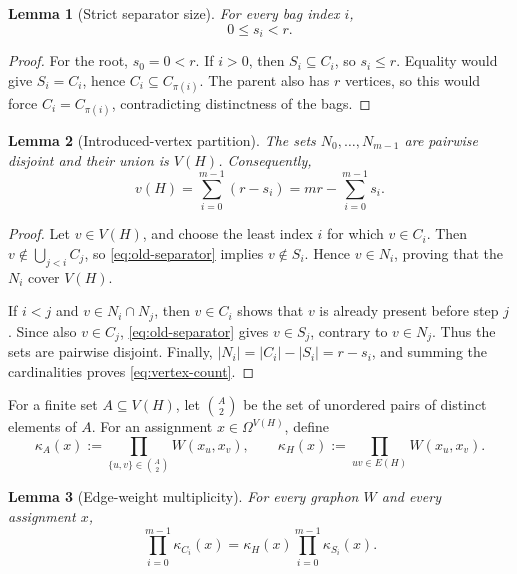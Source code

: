 \documentclass[11pt]{article}
\newtheorem{lemma}{Lemma}
\begin{document}
\begin{lemma}[Strict separator size]\label{lem:separator-size}
For every bag index \(i\),
\[
    0\le s_i<r.
\]
\end{lemma}

\begin{proof}
For the root, \(s_0=0<r\).  If \(i>0\), then \(S_i\subseteq C_i\), so
\(s_i\le r\).  Equality would give \(S_i=C_i\), hence
\(C_i\subseteq C_{\pi(i)}\).  The parent also has \(r\) vertices, so this
would force \(C_i=C_{\pi(i)}\), contradicting distinctness of the bags.
\end{proof}

\begin{lemma}[Introduced-vertex partition]\label{lem:new-partition}
The sets \(N_0,\dots,N_{m-1}\) are pairwise disjoint and their union is
\(V(H)\).  Consequently,
\begin{equation}\label{eq:vertex-count}
    v(H)
    =
    \sum_{i=0}^{m-1}(r-s_i)
    =
    mr-\sum_{i=0}^{m-1}s_i.
\end{equation}
\end{lemma}

\begin{proof}
Let \(v\in V(H)\), and choose the least index \(i\) for which \(v\in C_i\).
Then \(v\notin\bigcup_{j<i}C_j\), so
\eqref{eq:old-separator} implies \(v\notin S_i\).  Hence \(v\in N_i\), proving
that the \(N_i\) cover \(V(H)\).

If \(i<j\) and \(v\in N_i\cap N_j\), then \(v\in C_i\) shows that \(v\) is
already present before step \(j\).  Since also \(v\in C_j\),
\eqref{eq:old-separator} gives \(v\in S_j\), contrary to \(v\in N_j\).
Thus the sets are pairwise disjoint.  Finally,
\(|N_i|=|C_i|-|S_i|=r-s_i\), and summing the cardinalities proves
\eqref{eq:vertex-count}.
\end{proof}

For a finite set \(A\subseteq V(H)\), let \(\binom A2\) be the set of
unordered pairs of distinct elements of \(A\).  For an assignment
\(x\in\Omega^{V(H)}\), define
\[
    \kappa_A(x)
    :=
    \prod_{\{u,v\}\in\binom A2}W(x_u,x_v),
    \qquad
    \kappa_H(x)
    :=
    \prod_{uv\in E(H)}W(x_u,x_v).
\]

\begin{lemma}[Edge-weight multiplicity]\label{lem:edge-multiplicity}
For every graphon \(W\) and every assignment \(x\),
\begin{equation}\label{eq:edge-weight}
    \prod_{i=0}^{m-1}\kappa_{C_i}(x)
    =
    \kappa_H(x)
    \prod_{i=0}^{m-1}\kappa_{S_i}(x).
\end{equation}
\end{lemma}
\end{document}
